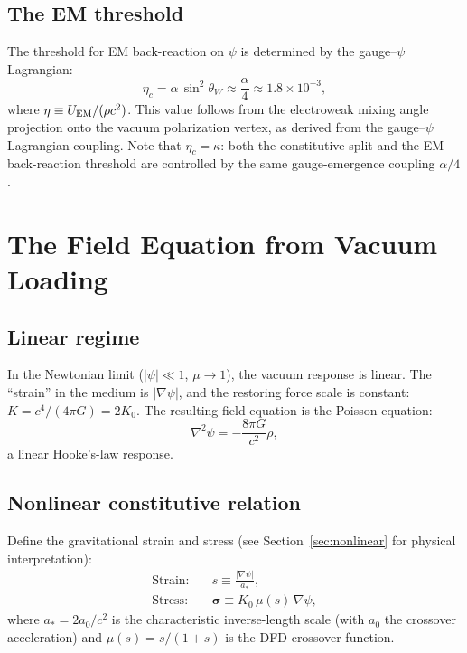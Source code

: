 \documentclass[aps,prd,twocolumn,superscriptaddress,nofootinbib]{revtex4-2}
\begin{document}
\subsection{The EM threshold}

The threshold for EM back-reaction on $\psi$ is determined by the
gauge--$\psi$ Lagrangian:
\begin{equation}
\eta_c = \alpha\,\sin^2\theta_W \approx \frac{\alpha}{4}
\approx 1.8\times 10^{-3},
\label{eq:eta-threshold}
\end{equation}
where $\eta \equiv U_{\rm EM}/(\rho c^2)$.  This value follows from
the electroweak mixing angle projection onto the vacuum polarization
vertex, as derived from the gauge--$\psi$ Lagrangian coupling.  Note
that $\eta_c = \kappa$: both the constitutive split and the EM
back-reaction threshold are controlled by the same gauge-emergence
coupling $\alpha/4$.


\section{The Field Equation from Vacuum Loading}
\label{sec:field-eqn}

\subsection{Linear regime}

In the Newtonian limit ($|\psi| \ll 1$, $\mu \to 1$), the vacuum
response is linear.  The ``strain'' in the medium is $|\nabla\psi|$,
and the restoring force scale is constant: $K = c^4/(4\pi G) = 2K_0$.  The
resulting field equation is the Poisson equation:
\begin{equation}
\nabla^2\psi = -\frac{8\pi G}{c^2}\rho,
\end{equation}
a linear Hooke's-law response.

\subsection{Nonlinear constitutive relation}

Define the gravitational strain and stress (see
Section~\ref{sec:nonlinear} for physical interpretation):
\begin{align}
\text{Strain:} \quad & s \equiv \frac{|\nabla\psi|}{a_*},
\label{eq:strain-def} \\
\text{Stress:} \quad & \bm{\sigma} \equiv
K_0\,\mu(s)\,\nabla\psi,
\label{eq:stress-def}
\end{align}
where $a_* = 2a_0/c^2$ is the characteristic inverse-length scale
(with $a_0$ the crossover acceleration) and
$\mu(s) = s/(1+s)$ is the DFD crossover function.
\end{document}
